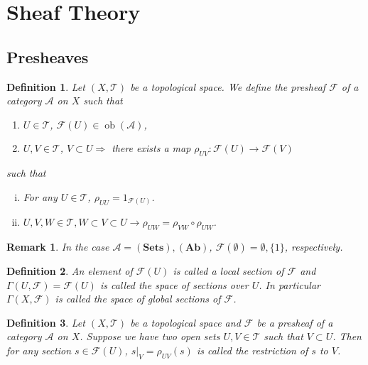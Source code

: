 \documentclass{article}
\newtheorem{definition}{Definition}[section]
\newtheorem{remark}{Remark}[section]
\numberwithin{equation}{section}
\DeclareMathOperator{\ob}{ob}
\begin{document}
\section{Sheaf Theory}

\subsection{Presheaves}

\begin{definition}
Let $(X,\mathcal{T})$ be a topological space. We define the presheaf $\mathcal{F}$ of a category $\mathcal{A}$ on $X$ such that 
\begin{enumerate}[\textbullet]
\item $U\in\mathcal{T}$, $\mathcal{F}(U)\in\ob(\mathcal{A})$,
\item $U,V\in\mathcal{T}$, $V\subset U \Rightarrow $ there exists a map $\rho_{UV}:\mathcal{F}(U)\to\mathcal{F}(V)$ 
\end{enumerate}

such that 
\begin{enumerate}[i).]
\item For any $U\in\mathcal{T}$, $\rho_{UU}=1_{\mathcal{F}(U)}$.
\item $U,V,W\in\mathcal{T}, W\subset V\subset U\rightarrow \rho_{UW}=\rho_{VW}\circ\rho_{UW}$.
\end{enumerate}
\end{definition}

\begin{remark}
In the case $\mathcal{A} = (\mathbf{Sets}),(\mathbf{Ab})$, $\mathcal{F}(\emptyset)=\emptyset,\{1\}$, respectively.
\end{remark}

\begin{definition}
An element of $\mathcal{F}(U)$ is called a local section of $\mathcal{F}$ and $\Gamma(U,\mathcal{F}) = \mathcal{F}(U)$ is called the space of sections over $U$. In particular $\Gamma(X,\mathcal{F})$ is called the space of global sections of $\mathcal{F}$.
\end{definition}

\begin{definition}
Let $(X,\mathcal{T})$ be a topological space and $\mathcal{F}$ be a presheaf of a category $\mathcal{A}$ on $X$. Suppose we have two open sets $U,V\in\mathcal{T}$ such that $V\subset U$. Then for any section $s\in\mathcal{F}(U)$, $s|_V=\rho_{UV}(s)$ is called the restriction of $s$ to $V$.
\end{definition}
\end{document}
